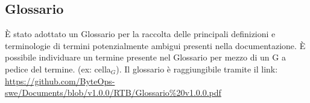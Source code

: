 \subsection{Glossario}
È stato adottato un Glossario per la raccolta delle principali definizioni e terminologie di termini potenzialmente ambigui presenti nella documentazione.
È possibile individuare un termine presente nel Glossario per mezzo di un G a pedice del termine.
(ex: cella\(_G\)).
\vspace{0.1cm}
Il glossario è raggiungibile tramite il link: \href{https://github.com/ByteOps-swe/Documents/blob/v1.0.0/RTB/Glossario%20v1.0.0.pdf}{https://github.com/ByteOps-swe/Documents/blob/v1.0.0/RTB/Glossario\%20v1.0.0.pdf}
